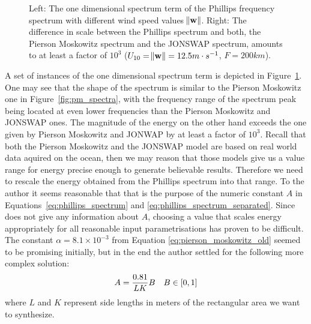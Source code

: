 \begin{figure}
\caption{Left: The one dimensional \wavenumber spectrum term of the Phillips 
frequency spectrum with different wind speed values $\norm{\mathbf{w}}$. Right: 
The difference in scale between the Phillips spectrum and both, the Pierson 
Moskowitz spectrum and the JONSWAP spectrum, amounts to at least a factor of 
$10^3$ ($U_{10}=\norm{\mathbf{w}}=12.5m\cdot s^{-1}$, $F=200km$).
}
\label{fig:phillips_spectra}
\end{figure}
%
A set of instances of the one dimensional \wavenumber spectrum term is depicted 
in Figure~\ref{fig:phillips_spectra}. One may see that the shape of the 
spectrum is similar to the Pierson Moskowitz one in Figure~\ref{fig:pm_spectra}, 
with the frequency range of the spectrum peak being located at even lower 
frequencies than the Pierson Moskowitz and JONSWAP ones. The magnitude of the 
energy on the other hand exceeds the one given by Pierson Moskowitz and JONWAP 
by at least a factor of $10^3$. Recall that both the Pierson Moskowitz and the 
JONSWAP model are based on real world data aquired on the ocean, then we may 
reason that those models give us a value range for energy precise enough to 
generate believable results. Therefore we need to rescale the energy obtained 
from the Phillips spectrum into that range. To the author it seems reasonable 
that that is the purpose of the numeric constant $A$ in 
Equations~\ref{eq:phillips_spectrum} and \ref{eq:phillips_spectrum_separated}. 
Since \citeauthor{course:simulatingocean} does not give any information about
$A$, choosing a value that  scales energy appropriately for all reasonable
input parametrisations has proven  to be difficult. The constant
$\alpha = 8.1 \times 10^{-3}$ from Equation \ref{eq:pierson_moskowitz_old}
seemed to be promising initially, but in the end 
the author settled for the following more complex solution:
\begin{align}
 A = \frac{0.81}{LK}B && B \in \interval{0}{1}
\end{align}
where $L$ and $K$ represent side lengths in meters of the rectangular area 
we want to synthesize.
%
